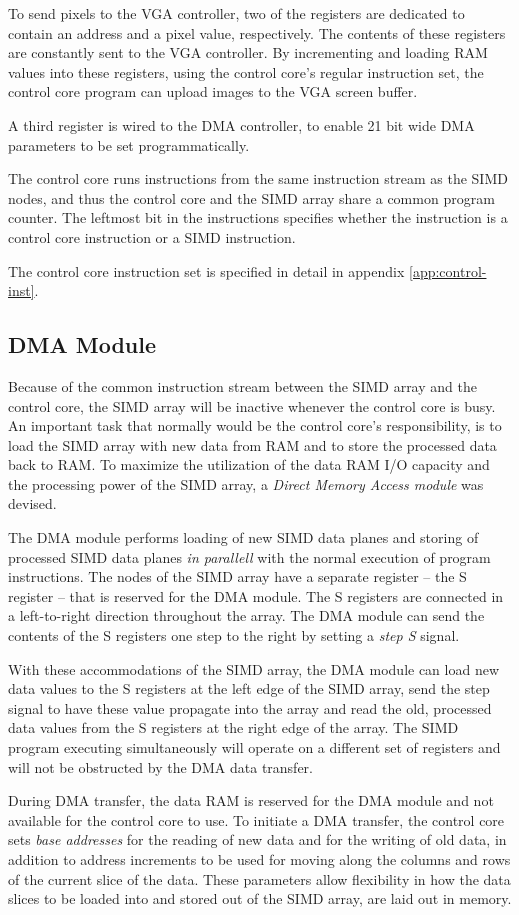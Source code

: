 

To send pixels to the VGA controller, two of the registers are dedicated
to contain an address and a pixel value, respectively. The contents of
these registers are constantly sent to the VGA controller. By
incrementing and loading RAM values into these registers, using the
control core's regular instruction set, the control core program can
upload images to the VGA screen buffer.

A third register is wired to the DMA controller, to enable 21 bit wide
DMA parameters to be set programmatically.

The control core runs instructions from the same instruction stream as
the SIMD nodes, and thus the control core and the SIMD array share a
common program counter. The leftmost bit in the instructions specifies
whether the instruction is a control core instruction or a SIMD
instruction.

The control core instruction set is specified in detail in appendix
\ref{app:control-inst}.

\subsection{DMA Module}

Because of the common instruction stream between the SIMD array and the
control core, the SIMD array will be inactive whenever the control core
is busy. An important task that normally would be the control core's
responsibility, is to load the SIMD array with new data from RAM and to
store the processed data back to RAM. To maximize the utilization of
the data RAM I/O capacity and the processing power of the SIMD array, a
\emph{Direct Memory Access module} was devised.

The DMA module performs loading of new SIMD data planes and storing of
processed SIMD data planes \emph{in parallell} with the normal execution
of program instructions. The nodes of the SIMD array have a separate
register -- the S register -- that is reserved for the DMA module. The S
registers are connected in a left-to-right direction throughout the
array. The DMA module can send the contents of the S registers one step
to the right by setting a \emph{step S} signal.

With these accommodations of the SIMD array, the DMA module can load new
data values to the S registers at the left edge of the SIMD array, send
the step signal to have these value propagate into the array and read
the old, processed data values from the S registers at the right edge of
the array. The SIMD program executing simultaneously will operate on a
different set of registers and will not be obstructed by the DMA data
transfer.

During DMA transfer, the data RAM is reserved for the DMA module and not
available for the control core to use. To initiate a DMA transfer, the
control core sets \emph{base addresses} for the reading of new data and
for the writing of old data, in addition to address increments to be
used for moving along the columns and rows of the current slice of the
data. These parameters allow flexibility in how the data slices to be
loaded into and stored out of the SIMD array, are laid out in memory.
